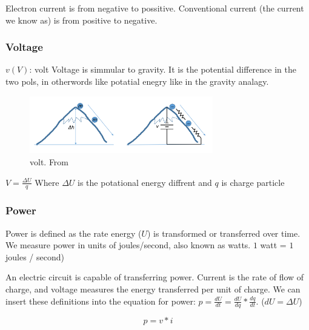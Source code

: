Electron current is from negative to possitive. Conventional current (the current we know as) is from
positive to negative.

\subsubsection{Voltage}
$v (V)$: volt \newline
Voltage is simmular to gravity. It is the potential difference in the two pols, in otherwords
like potatial enegry like in the gravity analagy.

\begin{figure}[H]
    \centering
    \includegraphics[width=8cm]{image/volt.png}
    \caption{volt. From \cite{de}}
\end{figure}

$V=\frac{\Delta{U}}{q}$ Where $\Delta{U}$ is the potational energy diffrent and $q$ is charge particle

\newpage
\subsubsection{Power}
Power is defined as the rate energy ($U$) is transformed or transferred over time. We measure power in units of joules/second, also known as watts.
$1$ watt = $1$ joules / second) \newline

An electric circuit is capable of transferring power. Current is the rate of flow of charge, and voltage measures the energy transferred per unit of charge. We can insert these definitions into the equation for power:
$p = \frac{dU}{dt} = \frac{dU}{dq} * \frac{dq}{dt}$. ($dU=\Delta{U}$)

\begin{equation} p = v*i \end{equation}

